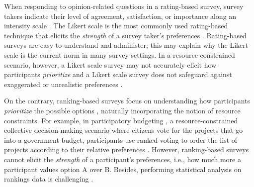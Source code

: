 

When responding to opinion-related questions in a rating-based survey, survey takers indicate their level of agreement, satisfaction, or importance along an intensity scale \cite{moors2016two}. The Likert scale is the most commonly used rating-based technique that elicits the \textit{strength} of a survey taker's preferences \cite{likert1932technique}. Rating-based surveys are easy to understand and administer; this may explain why the Likert scale is the current norm in many survey settings. In a resource-constrained scenario, however, a Likert scale survey may not accurately elicit how participants \textit{prioritize}  and a Likert scale survey does not safeguard against exaggerated or unrealistic preferences \cite{araujo2017much, vavreck2007exaggerated}.

On the contrary, ranking-based surveys focus on understanding how participants \textit{prioritize} the possible options \cite{moors2016two}, naturally incorporating the notion of resource constraints. For example, in participatory budgeting \cite{cabannes2004participatory}, a resource-constrained collective decision-making scenario where citizens vote for the projects that go into a government budget, participants use ranked voting to order the list of projects according to their relative preferences \cite{benade2020preference}. However, ranking-based surveys cannot elicit the \textit{strength} of a participant's preferences, i.e., how much more a participant values option A over B. Besides, performing statistical analysis on rankings data is challenging \cite{alwin1985measurement}.

